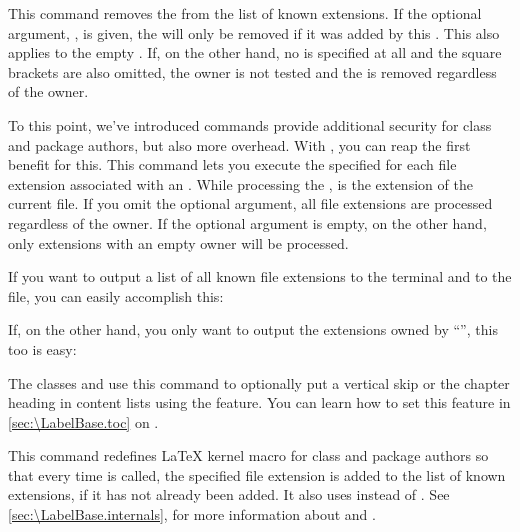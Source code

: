 \begin{Declaration}
\end{Declaration}
This command removes the  from the list of known extensions.
If the optional argument, , is given, the 
will only be removed if it was added by this .
This also applies to the empty .  If, on the other hand, no
 is specified at all and the square brackets are also
omitted, the owner is not tested and the  is removed
regardless of the owner.%
\EndIndexGroup


\begin{Declaration}
\end{Declaration}
To this point, we've introduced commands provide additional security for class
and package authors, but also more overhead. With ,
you can reap the first benefit for this. This command lets you execute the
specified  for each file extension associated with an
. While processing the ,  is the
extension of the current file. If you omit the optional 
argument, all file extensions are processed regardless of the owner. If the
optional argument is empty, on the other hand, only extensions with an empty
owner will be processed.
\begin{Example}
  If you want to output a list of all known file extensions to the terminal
  and to the  file, you can easily accomplish this:
\begin{lstcode}
  \doforeachtocfile{\typeout{\@currext}}
\end{lstcode}
  If, on the other hand, you only want to output the extensions owned by
  ``'', this too is easy:
\begin{lstcode}
  \doforeachtocfile[foo]{\typeout{\@currext}}
\end{lstcode}
\end{Example}
The \KOMAScript{} classes  and  use this
command to optionally put a vertical skip or the chapter heading in content
lists using the  feature. You can learn how to set this
feature in \autoref{sec:\LabelBase.toc} on
.%
\EndIndexGroup


\begin{Declaration}
\end{Declaration}
This command redefines \LaTeX{} kernel macro  for class and
package authors so that every time  is called, the specified
file extension is added to the list of known extensions, if it has not already
been added. It also uses  instead of
. See \autoref{sec:\LabelBase.internals},
 for more information about
 and .

